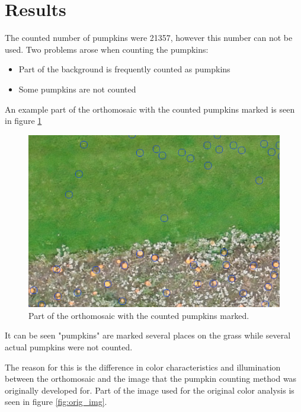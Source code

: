 \documentclass[../Head/Main.tex]{subfiles}
\begin{document}
\section{Results}
The counted number of pumpkins were 21357, however this number can not be used. Two problems arose when counting the pumpkins:
\begin{itemize}
\item Part of the background is frequently counted as pumpkins
\item Some pumpkins are not counted
\end{itemize}
An example part of the orthomosaic with the counted pumpkins marked is seen in figure \ref{fig:counted_wrong}

\begin{figure}[H]
	\centering
	\includegraphics[scale=0.42]{../Figures/counted_wrong.png}
	\caption{Part of the orthomosaic with the counted pumpkins marked.}
	\label{fig:counted_wrong}
\end{figure}

It can be seen "pumpkins" are marked several places on the grass while several actual pumpkins were not counted.\par
The reason for this is the difference in color characteristics and illumination between the orthomosaic and the image that the pumpkin counting method was originally developed for. Part of the image used for the original color analysis is seen in figure \ref{fig:orig_img}.
\end{document}
